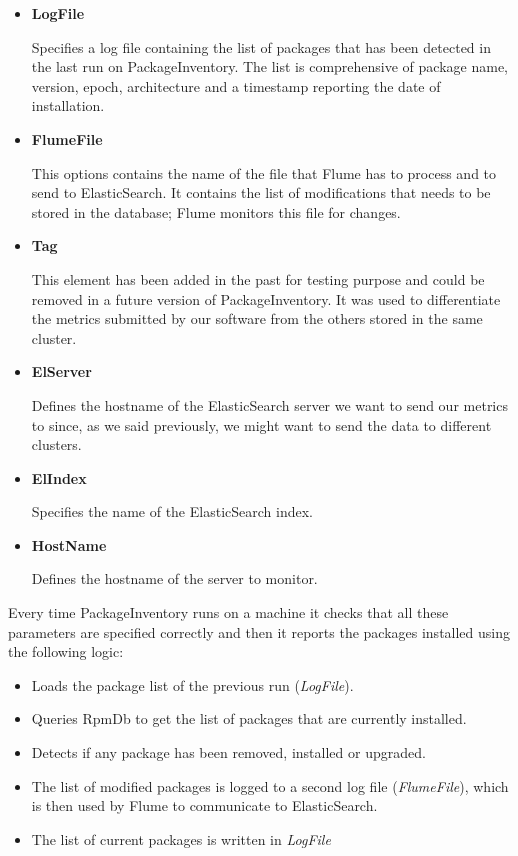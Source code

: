 \begin{itemize}
  \item \textbf{LogFile}
  
  Specifies a log file containing the list of packages that has been
  detected in the last run on PackageInventory. The list is comprehensive
  of package name, version, epoch, architecture and a timestamp reporting
  the date of installation.
  
  \item \textbf{FlumeFile}

  This options contains the name of the file that Flume has to process and
  to send to ElasticSearch. It contains the list of modifications that
  needs to be stored in the database; Flume monitors this file for
  changes.

  \item \textbf{Tag}

  This element has been added in the past for testing purpose and could be
  removed in a future version of PackageInventory. It was used to
  differentiate the metrics submitted by our software from the others
  stored in the same cluster.

  \item \textbf{ElServer}

  Defines the hostname of the ElasticSearch server we want to send our
  metrics to since, as we said previously, we might want to send the data
  to different clusters.

  \item \textbf{ElIndex}

  Specifies the name of the ElasticSearch index.

  \item \textbf{HostName}

  Defines the hostname of the server to monitor.

\end{itemize}

Every time PackageInventory runs on a machine it checks that all these
parameters are specified correctly and then it reports the packages
installed using the following logic:

\begin{itemize}
    \item Loads the package list of the previous run (\textit{LogFile}).
    \item Queries RpmDb to get the list of packages that are currently
            installed.
    \item Detects if any package has been removed, installed or upgraded.
    \item The list of modified packages is logged to a second log file
            (\textit{FlumeFile}), which is then used by Flume to communicate
            to ElasticSearch.
    \item The list of current packages is written in \textit{LogFile}
\end{itemize}

